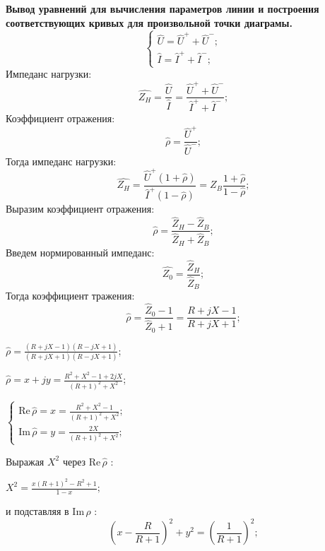 \documentclass[12pt,a4paper]{article}
\begin{document}
	\begin{minipage}{0.5\textwidth}
		\textbf{Вывод уравнений для вычисления параметров линии и построения соответствующих кривых для
		произвольной точки диаграмы.} \\
		\begin{equation}
			\begin{cases}
				\hat{U} = \hat{U}^+ + \hat{U}^-; \\
				\hat{I} = \hat{I}^+ + \hat{I}^-;
			\end{cases}
		\end{equation}
		Импеданс нагрузки:
		\begin{equation}
			\displaystyle \hat{Z_H} = \frac{\hat{U}}{\hat{I}} =
			\frac{\hat{U}^+ + \hat{U}^-}{\hat{I}^+ + \hat{I}^-};
		\end{equation}
		Коэффициент отражения:
		\begin{equation}
			\displaystyle \hat{\rho} = \frac{\hat{U}^+}{\hat{U}^-};
		\end{equation} 
		Тогда импеданс нагрузки:
		\begin{equation}
			\displaystyle \hat{Z_H} = \frac{\hat{U}^+(1+\hat{\rho})}{\hat{I}^+(1-\hat{\rho})} =
			\hat{Z_B} \frac{1+\hat{\rho}}{1-\hat{\rho}};
		\end{equation} 
		Выразим коэффициент отражения:
		\begin{equation}
			\hat{\rho} = \frac{\hat{Z}_H - \hat{Z}_B}{\hat{Z}_H + \hat{Z}_B};
		\end{equation} 
		Введем нормированный импеданс:
		\begin{equation}
			\hat{Z_0} = \frac{\hat{Z}_H}{\hat{Z}_B};
		\end{equation} 
		Тогда коэффициент тражения:
		\begin{equation}
			\hat{\rho} = \frac{\hat{Z}_0 - 1}{\hat{Z}_0 + 1} = \frac{R+jX-1}{R+jX+1};
		\end{equation}
		\begin{center}
			$\hat{\rho} = \displaystyle\frac{\left( R+jX-1 \right)\left( R-jX+1 \right)}{\left( R+jX+1 \right)\left( R-jX+1 \right)}$;
		\end{center}
		\begin{center}
			$\hat{\rho} = x+jy = \displaystyle\frac{R^2+X^2-1+2jX}{{(R+1)}^2+X^2}$;
		\end{center}
		\begin{center}
			$\begin{cases}
				\mathrm{Re}\,\hat{\rho} = x = \displaystyle\frac{R^2+X^2-1}{{(R+1)}^2+X^2}; \\
				\mathrm{Im}\,\hat{\rho} = y = \displaystyle\frac{2X}{{(R+1)}^2+X^2};
			\end{cases}$
		\end{center}
		Выражая $X^2$ через $\mathrm{Re}\,\hat{\rho}$ :
		\begin{center}
			$X^2 = \displaystyle\frac{x(R+1)^2-R^2+1}{1-x};$
		\end{center}
		и подставляя в $\mathrm{Im}\,\hat{\rho}$ :
		\begin{equation}
			\displaystyle {\left(x-\frac{R}{R+1}\right)}^2 + {y}^2 = {\left(\frac{1}{R+1}\right)}^2;
		\end{equation}
	\end{minipage}
\end{document}
